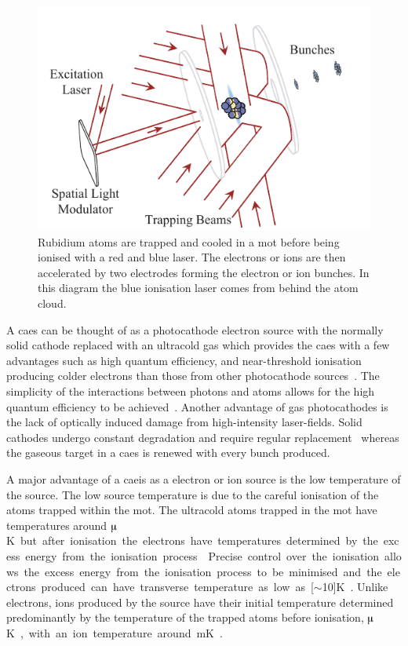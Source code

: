 \begin{figure}
    \center
    \includegraphics{0intro/Figs/simple_caeis_schem.pdf}
    \caption[Simplified cold atom ion and electron source schematic.]{Rubidium atoms are trapped and cooled in a \gls{mot} before being ionised with a red and blue laser. The electrons or ions are then accelerated by two electrodes forming the electron or ion bunches. In this diagram the blue ionisation laser comes from behind the atom cloud.}
    \label{figure:simple_caeis_schem}
\end{figure}

A \gls{caes} can be thought of as a photocathode electron source with the normally solid cathode replaced with an ultracold gas which provides the \gls{caes} with a few advantages such as high quantum efficiency, and near-threshold ionisation producing colder electrons than those from other photocathode sources~\cite{engelen_effective_2014}.
The simplicity of the interactions between photons and atoms allows for the high quantum efficiency to be achieved~\cite{baranov_field_1994}.
Another advantage of gas photocathodes is the lack of optically induced damage from high-intensity laser-fields.
Solid cathodes undergo constant degradation and require regular replacement~\cite{dowell_results_1995} whereas the gaseous target in a \gls{caes} is renewed with every bunch produced.

A major advantage of a \gls{caeis} as a electron or ion source is the low temperature of the source.
The low source temperature is due to the careful ionisation of the atoms trapped within the \gls{mot}.
The ultracold atoms trapped in the \gls{mot} have temperatures around \unit[100]{$\muup$K} but after ionisation the electrons have temperatures determined by the excess energy from the ionisation process~\cite{engelen_high-coherence_2013,engelen_analytical_2014,sparkes_high-coherence_2014,speirs_identification_2017}.
Precise control over the ionisation allows the excess energy from the ionisation process to be minimised and the electrons produced can have transverse temperature as low as \unit[$\sim$10]{K}~\cite{saliba_spatial_2012}.
Unlike electrons, ions produced by the source have their initial temperature determined predominantly by the temperature of the trapped atoms before ionisation, \unit[100]{$\muup$K}, with an ion temperature around \unit[1]{mK}~\cite{debernardi_measurement_2011,murphy_detailed_2014}.


